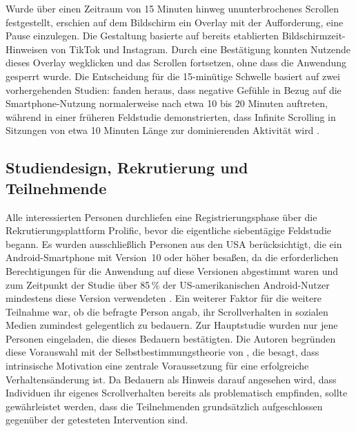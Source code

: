 \documentclass[11pt,a4paper]{article}
\begin{document}
Wurde über einen Zeitraum von 15 Minuten hinweg ununterbrochenes Scrollen festgestellt,
erschien auf dem Bildschirm ein Overlay mit der Aufforderung, eine Pause einzulegen. Die
Gestaltung basierte auf bereits etablierten Bildschirmzeit-Hinweisen von TikTok und
Instagram. Durch eine Bestätigung konnten Nutzende dieses Overlay wegklicken und das
Scrollen fortsetzen, ohne dass die Anwendung gesperrt wurde. Die Entscheidung für die
15-minütige Schwelle basiert auf zwei vorhergehenden Studien: \citet{terzimehic2022iwishihad}
fanden heraus, dass negative Gefühle in Bezug auf die Smartphone-Nutzung normalerweise nach
etwa 10 bis 20 Minuten auftreten, während \citet{rixen2023loop} in einer früheren Feldstudie
demonstrierten, dass Infinite Scrolling in Sitzungen von etwa 10 Minuten Länge zur
dominierenden Aktivität wird \citep{meinhardt2025scrolling}.

\subsection{Studiendesign, Rekrutierung und Teilnehmende}

Alle interessierten Personen durchliefen eine Registrierungsphase über die
Rekrutierungsplattform Prolific, bevor die eigentliche siebentägige Feldstudie begann. Es
wurden ausschließlich Personen aus den USA berücksichtigt, die ein Android-Smartphone mit
Version~10 oder höher besaßen, da die erforderlichen Berechtigungen für die Anwendung auf
diese Versionen abgestimmt waren und zum Zeitpunkt der Studie über 85\,\% der
US-amerikanischen Android-Nutzer mindestens diese Version verwendeten
\citep{meinhardt2025scrolling}. Ein weiterer Faktor für die weitere Teilnahme war, ob die
befragte Person angab, ihr Scrollverhalten in sozialen Medien zumindest gelegentlich zu
bedauern. Zur Hauptstudie wurden nur jene Personen eingeladen, die dieses Bedauern
bestätigten. Die Autoren begründen diese Vorauswahl mit der Selbstbestimmungstheorie von
\citet{ryan2000selfdetermination}, die besagt, dass intrinsische Motivation eine zentrale
Voraussetzung für eine
erfolgreiche Verhaltensänderung ist. Da Bedauern als Hinweis darauf angesehen wird, dass
Individuen ihr eigenes Scrollverhalten bereits als problematisch empfinden, sollte
gewährleistet werden, dass die Teilnehmenden grundsätzlich aufgeschlossen gegenüber der
getesteten Intervention sind.

\vspace{\baselineskip}
\vspace{\baselineskip}
\end{document}
